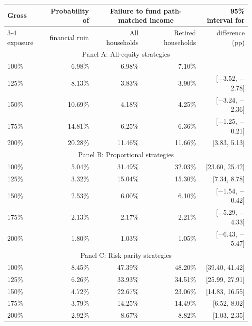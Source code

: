 \begin{table}[p]
{\small\setlength{\tabcolsep}{4pt}\begin{tabular}{lrrrr}\toprule
Gross & Probability of & \multicolumn{2}{c}{Failure to fund path-matched income} & 95\% interval for \\ \cmidrule(lr){3-4}
exposure & financial ruin & All households & Retired households & difference (pp) \\ \midrule
\multicolumn{5}{c}{Panel A: All-equity strategies} \\
100\% & 6.98\% & 6.98\% & 7.10\% & --- \\
125\% & 8.13\% & 3.83\% & 3.90\% & [$-$3.52, $-$2.78] \\
150\% & 10.69\% & 4.18\% & 4.25\% & [$-$3.24, $-$2.36] \\
175\% & 14.81\% & 6.25\% & 6.36\% & [$-$1.25, $-$0.21] \\
200\% & 20.28\% & 11.46\% & 11.66\% & [3.83, 5.13] \\
\multicolumn{5}{c}{Panel B: Proportional strategies} \\
100\% & 5.04\% & 31.49\% & 32.03\% & [23.60, 25.42] \\
125\% & 3.32\% & 15.04\% & 15.30\% & [7.34, 8.78] \\
150\% & 2.53\% & 6.00\% & 6.10\% & [$-$1.54, $-$0.42] \\
175\% & 2.13\% & 2.17\% & 2.21\% & [$-$5.29, $-$4.33] \\
200\% & 1.80\% & 1.03\% & 1.05\% & [$-$6.43, $-$5.47] \\
\multicolumn{5}{c}{Panel C: Risk parity strategies} \\
100\% & 8.45\% & 47.39\% & 48.20\% & [39.40, 41.42] \\
125\% & 6.26\% & 33.93\% & 34.51\% & [25.99, 27.91] \\
150\% & 4.72\% & 22.67\% & 23.06\% & [14.83, 16.55] \\
175\% & 3.79\% & 14.25\% & 14.49\% & [6.52, 8.02] \\
200\% & 2.92\% & 8.67\% & 8.82\% & [1.03, 2.35] \\
\bottomrule\end{tabular}}
\end{table}

